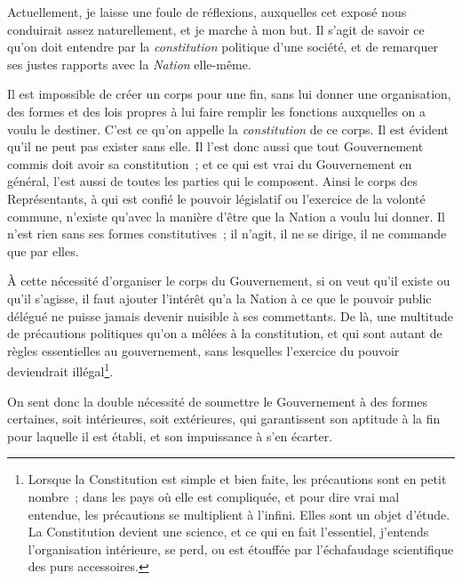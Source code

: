 \documentclass[french,twoside]{book} %
\begin{document}
Actuellement, je laisse une foule de réflexions, auxquelles cet exposé nous conduirait assez naturellement, et je marche à mon but. Il s’agit de savoir ce qu’on doit entendre par la {\itshape constitution} politique d’une société, et de remarquer ses justes rapports avec la {\itshape Nation} elle-même.\par
Il est impossible de créer un corps pour une fin, sans lui donner une organisation, des formes et des lois propres à lui faire remplir les fonctions auxquelles on a voulu le destiner. C’est ce qu’on appelle la {\itshape constitution} de ce corps. Il est évident qu’il ne peut pas exister sans elle. Il l’est donc aussi que tout Gouvernement commis doit avoir sa constitution ; et ce qui est vrai du Gouvernement en général, l’est aussi de toutes les parties qui le composent. Ainsi le corps des Représentants, à qui est confié le pouvoir législatif ou l’exercice de la volonté commune, n’existe qu’avec la manière d’être que la Nation a voulu lui donner. Il n’est rien sans ses formes constitutives ; il n’agit, il ne se dirige, il ne commande que par elles.\par
À cette nécessité d’organiser le corps du Gouvernement, si on veut qu’il existe ou qu’il s’agisse, il faut ajouter l’intérêt qu’a la Nation à ce que le pouvoir public délégué ne puisse jamais devenir nuisible à ses commettants. De là, une multitude de précautions politiques qu’on a mêlées à la constitution, et qui sont autant de règles essentielles au gouvernement, sans lesquelles l’exercice du pouvoir deviendrait illégal\footnote{Lorsque la Constitution est simple et bien faite, les précautions sont en petit nombre ; dans les pays où elle est compliquée, et pour dire vrai mal entendue, les précautions se multiplient à l’infini. Elles sont un objet d’étude. La Constitution devient une science, et ce qui en fait l’essentiel, j’entends l’organisation intérieure, se perd, ou est étouffée par l’échafaudage scientifique des purs accessoires.}.\par
On sent donc la double nécessité de soumettre le Gouvernement à des formes certaines, soit intérieures, soit extérieures, qui garantissent son aptitude à la fin pour laquelle il est établi, et son impuissance à s’en écarter.\par
\end{document}

